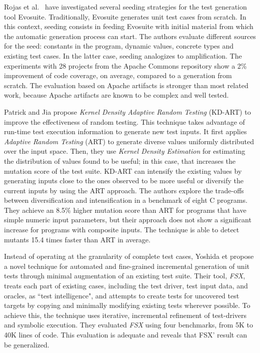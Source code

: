 Rojas et al.~\cite{rojas2016seeding} have investigated several seeding strategies for the test generation tool Evosuite. 
Traditionally, Evosuite generates unit test cases from scratch.
In this context, seeding consists in feeding Evosuite with initial material from which the automatic generation process can start. 
The authors evaluate different sources for the seed: constants in the program, dynamic values, concrete types and existing test cases. 
In the latter case, seeding analogizes to amplification. 
The experiments with 28 projects from the Apache Commons repository show a 2\% improvement of code coverage, on average, compared to a generation from scratch.
The evaluation based on Apache artifacts is stronger than most related work, because Apache artifacts are known to be complex and well tested.

Patrick and Jia \cite{Patrick201736} propose \emph{Kernel Density Adaptive Random Testing} (KD-ART) to improve the effectiveness of random testing.
This technique takes advantage of run-time test execution information to generate new test inputs. 
It first applies \emph{Adaptive Random Testing} (ART) to generate diverse values uniformly distributed over the input space. 
Then, they use \emph{Kernel Density Estimation} for estimating the distribution of values found to be useful; in this case, that increases the mutation score of the test suite. 
KD-ART can intensify the existing values by generating inputs close to the ones observed to be more useful or diversify the current inputs by using the ART approach. 
The authors explore the trade-offs between diversification and intensification in a benchmark of eight C programs. 
They achieve an 8.5\% higher mutation score than ART for programs that have simple numeric input parameters, but their approach does not show a significant increase for programs with composite inputs. 
The technique is able to detect mutants 15.4 times faster than ART in average.

Instead of operating at the granularity of complete test cases, Yoshida et \etal\cite{Yoshida2016} propose a novel technique for automated and fine-grained incremental generation of unit tests through minimal augmentation  of an existing test suite. 
Their tool, \emph{FSX}, treats each part of existing cases, including the test driver, test input data, and oracles, as “test intelligence", and attempts to create tests for uncovered test targets by copying and minimally modifying existing tests wherever possible. 
To achieve this, the technique uses iterative, incremental refinement of test-drivers and symbolic execution.
They evaluated \emph{FSX} using four benchmarks, from 5K to 40K lines of code. 
This evaluation is adequate and reveals that FSX' result can be generalized.

